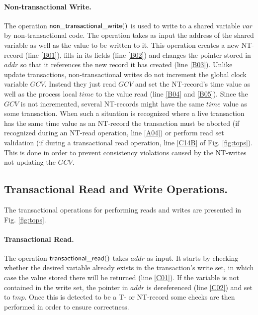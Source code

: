 \paragraph{Non-transactional Write.}
The operation ${\sf non\_transactional\_write()}$ is used to write to 
a shared variable $\mathit{var}$ 
by non-transactional code.
The operation takes as input the address of the shared variable as well as the 
value to be written to it.
This operation  
creates a  new  NT-record  (line  \ref{B01}),  fills  in  its  fields  (line
\ref{B02})  and 
changes the pointer stored in $\mathit{addr}$ so that it references the 
new record it has created  (line \ref{B03}).
Unlike update transactions, non-transactional writes do not increment
the global clock variable $\mathit{GCV}$.
Instead they just read $\mathit{GCV}$ and set the NT-record's time value as well as
the process local $\mathit{time}$ to the value read (line \ref{B04} and \ref{B05}).
Since the $\mathit{GCV}$ is not incremented, several NT-records might have the same
$\mathit{time}$ value as some transaction.
When such a situation is recognized where a live transaction has the same time value
as an NT-record the transaction must be aborted (if recognized during an NT-read operation,
line \ref{A04}) or perform read set validation (if during a transactional
read operation, line \ref{C14B} of Fig. \ref{fig:tops}).
This is done in order to prevent consistency violations
caused by the NT-writes not updating the $\mathit{GCV}$. %

\subsection{Transactional Read and Write Operations.}

The transactional operations for performing reads and writes are 
presented in Fig. \ref{fig:tops}. 

\paragraph{Transactional Read.}

The operation ${\sf  transactional\_read()}$ takes $\mathit{addr}$ as
input. It starts by checking  
whether the  desired variable already  exists in the  transaction{}'s write
set, in which  
case  the   value  stored there  will   be  returned  (line
\ref{C01}). If the variable is not contained  
in  the write  set, the  pointer in  $\mathit{addr}$ is  dereferenced (line
\ref{C02}) and set to $\mathit{tmp}$. Once this is detected to be a T- or NT-record
some checks are then performed in order to ensure correctness.

